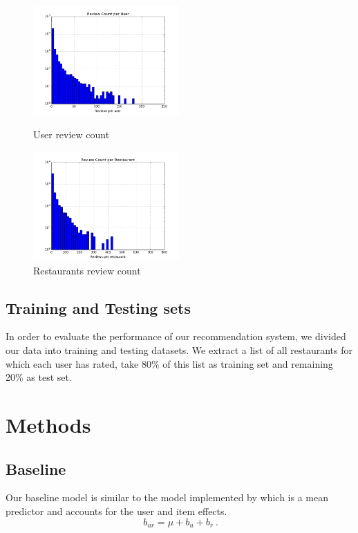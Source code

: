 \documentclass{llncs}
\begin{document}
\begin{figure}
	\begin{minipage}[t]{0.5\textwidth}
		\centering
		\includegraphics[width=2.2in]{fig1.png}
		\caption{User review count}
		\label{fig:side:a}
	\end{minipage}%
	\begin{minipage}[t]{0.5\textwidth}
		\centering
		\includegraphics[width=2.2in]{fig2.png}
		\caption{Restaurants review count}
		\label{fig:side:b}
	\end{minipage}
\end{figure}

\subsection{Training and Testing sets}
%
In order to evaluate the performance of our recommendation system, we divided our data into training and testing datasets. We extract a list of all restaurants for which each user has rated, take 80\% of this list as training set and remaining 20\% as test set. 

\section{Methods}
\subsection{Baseline}
Our baseline model is similar to the model implemented by\cite{Yehuda} which is a mean predictor and accounts for the user and item effects. 
\begin{equation}
\ b_{ur} = \mu + b_u + b_r \ .
\end{equation}
\end{document}
